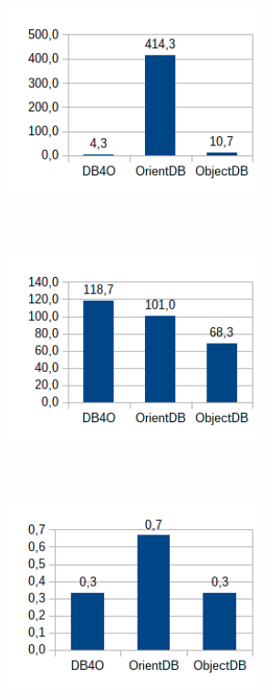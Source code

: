 \begin{figure}[!h]
\begin{subfigure}[b]{0.5\textwidth}
\includegraphics[width=20em, height=18em]{obr/bench/oodbms6}
\end{subfigure}
\begin{subfigure}[b]{0.5\textwidth}
\includegraphics[width=20em, height=18em]{obr/bench/oodbms7}
\end{subfigure}
\begin{subfigure}[b]{0.5\textwidth}
\includegraphics[width=20em, height=18em]{obr/bench/oodbms8}
\end{subfigure}
\end{figure}

